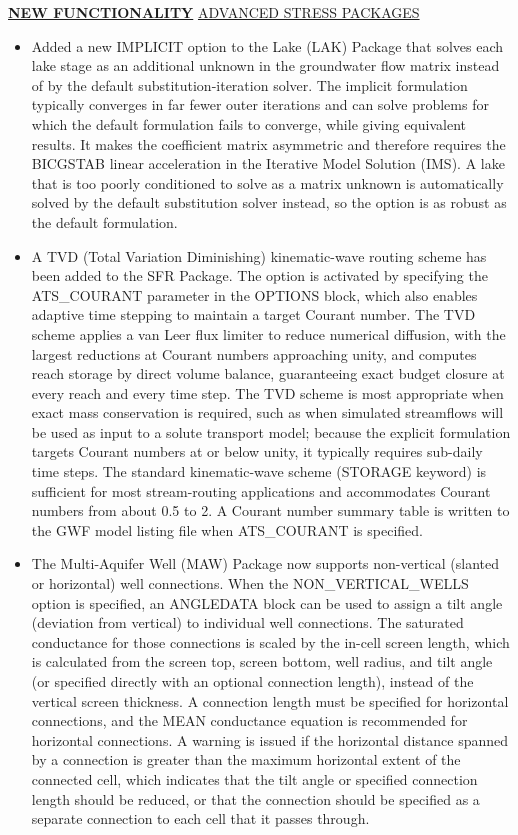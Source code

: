 \textbf{\underline{NEW FUNCTIONALITY}}
\underline{ADVANCED STRESS PACKAGES}
\begin{itemize}
\item Added a new IMPLICIT option to the Lake (LAK) Package that solves each lake stage as an additional unknown in the groundwater flow matrix instead of by the default substitution-iteration solver. The implicit formulation typically converges in far fewer outer iterations and can solve problems for which the default formulation fails to converge, while giving equivalent results. It makes the coefficient matrix asymmetric and therefore requires the BICGSTAB linear acceleration in the Iterative Model Solution (IMS). A lake that is too poorly conditioned to solve as a matrix unknown is automatically solved by the default substitution solver instead, so the option is as robust as the default formulation.
\item A TVD (Total Variation Diminishing) kinematic-wave routing scheme has been added to the SFR Package. The option is activated by specifying the ATS\_COURANT parameter in the OPTIONS block, which also enables adaptive time stepping to maintain a target Courant number. The TVD scheme applies a van Leer flux limiter to reduce numerical diffusion, with the largest reductions at Courant numbers approaching unity, and computes reach storage by direct volume balance, guaranteeing exact budget closure at every reach and every time step. The TVD scheme is most appropriate when exact mass conservation is required, such as when simulated streamflows will be used as input to a solute transport model; because the explicit formulation targets Courant numbers at or below unity, it typically requires sub-daily time steps. The standard kinematic-wave scheme (STORAGE keyword) is sufficient for most stream-routing applications and accommodates Courant numbers from about 0.5 to 2. A Courant number summary table is written to the GWF model listing file when ATS\_COURANT is specified.
\item The Multi-Aquifer Well (MAW) Package now supports non-vertical (slanted or horizontal) well connections. When the NON\_VERTICAL\_WELLS option is specified, an ANGLEDATA block can be used to assign a tilt angle (deviation from vertical) to individual well connections. The saturated conductance for those connections is scaled by the in-cell screen length, which is calculated from the screen top, screen bottom, well radius, and tilt angle (or specified directly with an optional connection length), instead of the vertical screen thickness. A connection length must be specified for horizontal connections, and the MEAN conductance equation is recommended for horizontal connections. A warning is issued if the horizontal distance spanned by a connection is greater than the maximum horizontal extent of the connected cell, which indicates that the tilt angle or specified connection length should be reduced, or that the connection should be specified as a separate connection to each cell that it passes through.

\end{itemize}
